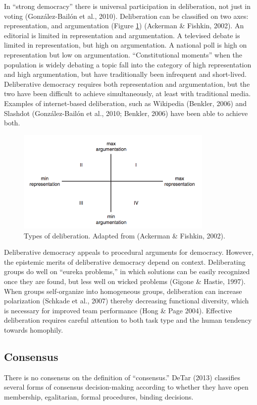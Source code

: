In ``strong democracy'' there is universal participation in deliberation, not just in voting (Gonz\'alez-Bail\'on et al., 2010). Deliberation can be classified on two axes: representation, and argumentation (Figure \ref{fig:deliberation}) (Ackerman \& Fishkin, 2002). An editorial is limited in representation and argumentation. A televised debate is limited in representation, but high on argumentation. A national poll is high on representation but low on argumentation. ``Constitutional moments'' when the population is widely debating a topic fall into the category of high representation and high argumentation, but have traditionally been infrequent and short-lived. Deliberative democracy requires both representation and argumentation, but the two have been difficult to achieve simultaneously, at least with traditional media. Examples of internet-based deliberation, such as Wikipedia (Benkler, 2006) and Slashdot (Gonz\'alez-Bail\'on et al., 2010; Benkler, 2006) have been able to achieve both.

\begin{figure}
\centering
\includegraphics[width=3.75in]{images/fig-deliberation.png}
\caption{Types of deliberation. Adapted from (Ackerman \& Fishkin, 2002).\label{fig:deliberation}}
\end{figure}

Deliberative democracy appeals to procedural arguments for democracy. However, the epistemic merits of deliberative democracy depend on context. Deliberating groups do well on ``eureka problems,'' in which solutions can be easily recognized once they are found, but less well on wicked problems (Gigone \& Hastie, 1997). When groups self-organize into homogeneous groups, deliberation can increase polarization (Schkade et al., 2007) thereby decreasing functional diversity, which is necessary for improved team performance (Hong \& Page 2004). Effective deliberation requires careful attention to both task type and the human tendency towards homophily.

\subsection{Consensus}
There is no consensus on the definition of ``consensus.''
DeTar (2013) classifies several forms of consensus decision-making according to whether they have open membership, egalitarian, formal procedures, binding decisions.

